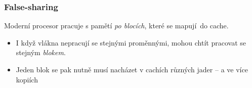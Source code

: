 \documentclass[usenames,dvipsnames,9pt]{beamer}
\begin{document}
\begin{frame}[t]
  \frametitle{False-sharing}
  Moderní procesor pracuje s pamětí \emph{po blocích}, které se mapují do cache.
  \begin{itemize}
    \item I když vlákna nepracují se stejnými proměnnými, mohou chtít pracovat se stejným \emph{blokem}.
    \item Jeden blok se pak nutně musí nacházet v cachích různých jader -- a ve více kopiích
  \end{itemize}
  \vspace{1em}
  \begin{01/figure}
    \centering

\end{01/figure}
\end{frame}
\end{document}
